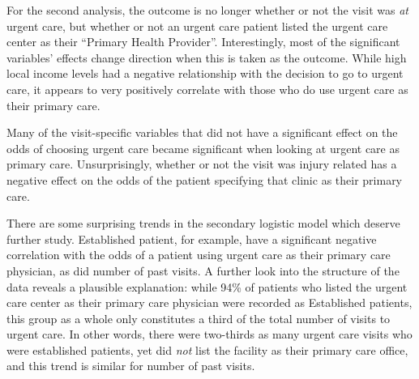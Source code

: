 \documentclass[12pt,twoside]{reedthesis}
\begin{document}
  For the second analysis, the outcome is no longer whether or not the
  visit was \emph{at} urgent care, but whether or not an urgent care
  patient listed the urgent care center as their ``Primary Health
  Provider''. Interestingly, most of the significant variables' effects
  change direction when this is taken as the outcome. While high local
  income levels had a negative relationship with the decision to go to
  urgent care, it appears to very positively correlate with those who do
  use urgent care as their primary care.
  
  Many of the visit-specific variables that did not have a significant
  effect on the odds of choosing urgent care became significant when
  looking at urgent care as primary care. Unsurprisingly, whether or not
  the visit was injury related has a negative effect on the odds of the
  patient specifying that clinic as their primary care.
  
  There are some surprising trends in the secondary logistic model which
  deserve further study. Established patient, for example, have a
  significant negative correlation with the odds of a patient using urgent
  care as their primary care physician, as did number of past visits. A
  further look into the structure of the data reveals a plausible
  explanation: while 94\% of patients who listed the urgent care center as
  their primary care physician were recorded as Established patients, this
  group as a whole only constitutes a third of the total number of visits
  to urgent care. In other words, there were two-thirds as many urgent
  care visits who were established patients, yet did \emph{not} list the
  facility as their primary care office, and this trend is similar for
  number of past visits.
  
  \singlespacing
  
\end{document}
